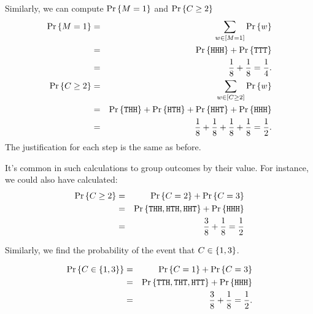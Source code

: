 \documentclass[11pt,twoside]{article}
\begin{document}
Similarly, we can compute $\pr{M = 1}$ and $\pr{C \geq 2}$
\begin{eqnarray*}
\pr{M = 1}      & = & \sum_{w \in [M = 1]} \pr{w} \\
                & = & \pr{\mathtt{HHH}} + \pr{\mathtt{TTT}}\\
                & = & \frac{1}{8} + \frac{1}{8} = \frac{1}{4}.
\\
\pr{C \geq 2}   & = &   \sum_{w \in [C \geq 2]} \pr{w} \\
                & = &   \pr{\mathtt{THH}} + \pr{\mathtt{HTH}} + \pr{\mathtt{HHT}} + \pr{\mathtt{HHH}} \\
             & = &   \frac{1}{8}+\frac{1}{8}+\frac{1}{8}+\frac{1}{8} = \frac{1}{2}.
\end{eqnarray*}
The justification for each step is the same as before.

It's common in such calculations to group outcomes by their value.
For instance, we could also have calculated:
\begin{eqnarray*}
\pr{C \geq 2}   & = &   \pr{C = 2} + \pr{C = 3} \\
                & = &   \pr{\mathtt{THH}, \mathtt{HTH}, \mathtt{HHT}} + \pr{\mathtt{HHH}} \\
                & = &   \frac{3}{8}+\frac{1}{8} = \frac{1}{2}
\end{eqnarray*}

Similarly, we find the probability of the event that $C \in \set{ 1, 3}$.

\begin{eqnarray*}
\pr{C \in \{1, 3 \}} & = &   \pr{C = 1} + \pr{C = 3} \\
                     & = &   \pr{\mathtt{TTH}, \mathtt{THT}, \mathtt{HTT}}
                              + \pr{\mathtt{HHH}} \\
        & = &   \frac{3}{8}+\frac{1}{8} = \frac{1}{2}.
\end{eqnarray*}
\end{document}

